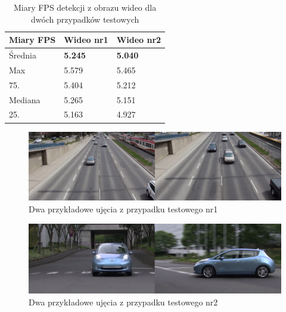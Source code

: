 \begin{table}[h!]
\begin{center}
\begin{tabular}{|l|l|l|}
\hline
\multicolumn{1}{|c|}{Miary FPS} & Wideo nr1 & Wideo nr2 \\ \hline
Średnia                         & \textbf{5.245}     & \textbf{5.040}     \\ \hline
Max                             & 5.579     & 5.465     \\ \hline
75.                             & 5.404     & 5.212     \\ \hline
Mediana                         & 5.265     & 5.151     \\ \hline
25.                             & 5.163     & 4.927     \\ \hline
\end{tabular}
\caption{Miary FPS detekcji z obrazu wideo dla dwóch przypadków testowych}
\label{tab:fps_detection}
\end{center}
\end{table}

\begin{figure}[h!]
    \begin{center}
        \includegraphics[scale=0.21]{img/cam1.png}
    \end{center}
    \caption{Dwa przykładowe ujęcia z przypadku testowego nr1}
    \label{fig:cam1}
\end{figure}

\begin{figure}[h!]
    \begin{center}
        \includegraphics[scale=0.28]{img/cam2.png}
    \end{center}
    \caption{Dwa przykładowe ujęcia z przypadku testowego nr2}
    \label{fig:cam2}
\end{figure}

